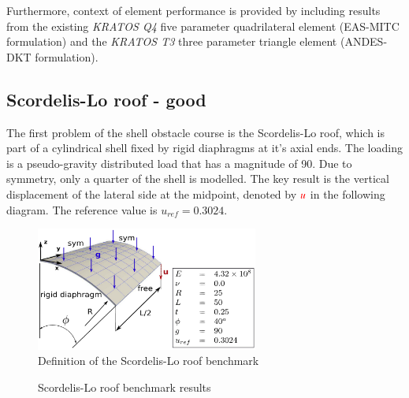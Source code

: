 Furthermore, context of element performance is provided by including results from the existing \textit{KRATOS Q4} five parameter quadrilateral element (EAS-MITC formulation) and the \textit{KRATOS T3} three parameter triangle element (ANDES-DKT formulation).
\newpage
\subsection{Scordelis-Lo roof - good}
%

The first problem of the shell obstacle course is the Scordelis-Lo roof, which is part of a cylindrical shell fixed by rigid diaphragms at it's axial ends. The loading is a pseudo-gravity distributed load that has a magnitude of 90. Due to symmetry, only a quarter of the shell is modelled. The key result is the vertical displacement of the lateral side at the midpoint, denoted by $\textcolor{red}{u}$ in the following diagram. The reference value is $u_{ref} = 0.3024$.
 
  \begin{figure}[H]
 	\centering
 	\def\svgwidth{\columnwidth}
 	\includegraphics[width=7.3cm]{images/scordelisroof.png}
 	\caption{Definition of the Scordelis-Lo roof benchmark\cite{Bou13}}
 \end{figure}
 
\begin{figure}[H]
	\caption{\label{ref_label_overall}Scordelis-Lo roof benchmark results}
\end{figure}

